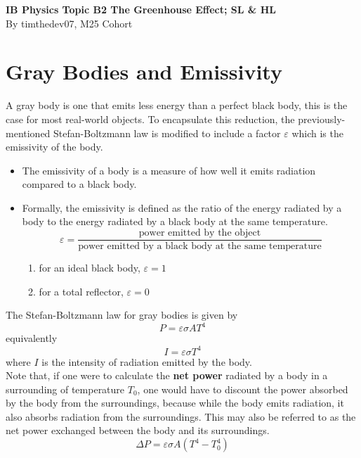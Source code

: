 \documentclass[a4paper,12pt]{article}
\let\oldsection\section
\renewcommand\section{\clearpage\oldsection}
\newcommand{\lb}{\\[8pt]}
\newcommand{\paren}[1]{\left(#1\right)}
\begin{document}
\pagestyle{fancy}


\begin{titlepage}
  \begin{center}

    \vspace*{8cm}
    \textbf{\Large {IB Physics Topic B2 The Greenhouse Effect; SL \& HL}} \\
    \vspace*{1cm}
    \large{By timthedev07, M25 Cohort}

  \end{center}
\end{titlepage}

\pagebreak
\tableofcontents
\pagebreak

\clearpage
\setcounter{page}{1}

\section{Gray Bodies and Emissivity}

A gray body is one that emits less energy than a perfect black body, this is the case for most real-world objects. To encapsulate this reduction, the previously-mentioned Stefan-Boltzmann law is modified to include a factor $\varepsilon$ which is the emissivity of the body.
\begin{itemize}
  \item The emissivity of a body is a measure of how well it emits radiation compared to a black body.
  \item Formally, the emissivity is defined as the ratio of the energy radiated by a body to the energy radiated by a black body at the same temperature.
        $$\varepsilon = \frac{\text{power emitted by the object}}{\text{power emitted by a black body at the same temperature}}$$
        \begin{enumerate}
          \item for an ideal black body, $\varepsilon = 1$
          \item for a total reflector, $\varepsilon = 0$
        \end{enumerate}
\end{itemize}

The Stefan-Boltzmann law for gray bodies is given by
\begin{equation}\label{eq:stefan-boltzmann-law-gray}
  P = \varepsilon \sigma A T^4
\end{equation}
equivalently
$$I = \varepsilon \sigma T^4$$
where $I$ is the intensity of radiation emitted by the body.\lb
Note that, if one were to calculate the \textbf{net power} radiated by a body in a surrounding of temperature $T_0$, one would have to discount the power absorbed by the body from the surroundings, because while the body emits radiation, it also absorbs radiation from the surroundings. This may also be referred to as the net power exchanged between the body and its surroundings.
$$\Delta P = \varepsilon \sigma A \paren{T^4 - T_0^4}$$
\end{document}
